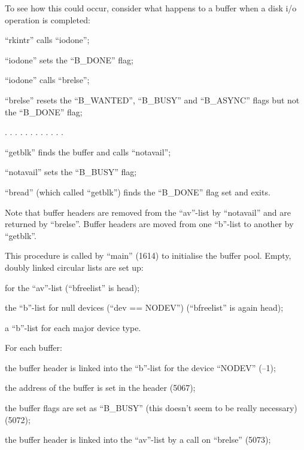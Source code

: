 To see how this could occur, consider
what happens to a buffer when a disk
i/o operation is completed:

\bd
\item[5471] ``rkintr'' calls ``iodone'';
\item[5026] ``iodone'' sets the ``B\_DONE'' flag;
\item[5028] ``iodone'' calls ``brelse'';
\item[4387] ``brelse'' resets the ``B\_WANTED'',
``B\_BUSY'' and ``B\_ASYNC'' flags
but not the ``B\_DONE'' flag;

. . . . . . . . . . . .

\item[4948] ``getblk'' finds the buffer and
 calls ``notavail'';
\item[5010] ``notavail'' sets the ``B\_BUSY'' flag;
\item[4759] ``bread'' (which called ``getblk'')
 finds the ``B\_DONE'' flag set and exits.
\ed

Note that buffer headers are removed
from the ``av''-list by ``notavail'' and
are returned by ``brelse''. Buffer
headers are moved from one ``b''-list to
another by ``getblk''.



This procedure is called by ``main''
(1614) to initialise the buffer pool.
Empty, doubly linked circular lists are
set up:

\bi
\item for the ``av''-list (``bfreelist'' is
 head);

\item the ``b''-list for null devices (``dev
 == NODEV'') (``bfreelist'' is again
 head);

\item a ``b''-list for each major device
 type.
\ei

\noindent For each buffer:

\bi
\item the buffer header is linked into the
 ``b''-list for the device ``NODEV'' (--1);

\item the address of the buffer is set in
 the header (5067);

\item the buffer flags are set as ``B\_BUSY''
 (this doesn't seem to be really
 necessary) (5072);

\item the buffer header is linked into the
 ``av''-list by a call on ``brelse'' (5073);
\ei


